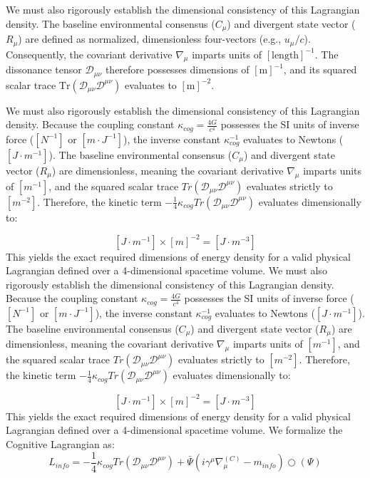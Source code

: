 \documentclass[12pt,openany]{book}
\theoremstyle{plain}
\theoremstyle{definition}
\theoremstyle{remark}
\begin{document}
We must also rigorously establish the dimensional consistency of this Lagrangian density. The baseline environmental consensus ($C_\mu$) and divergent state vector ($R_\mu$) are defined as normalized, dimensionless four-vectors (e.g., $u_\mu/c$). Consequently, the covariant derivative $\nabla_\mu$ imparts units of $[\text{length}]^{-1}$. The dissonance tensor $\mathcal{D}_{\mu\nu}$ therefore possesses dimensions of $[\text{m}]^{-1}$, and its squared scalar trace $\text{Tr}(\mathcal{D}_{\mu\nu} \mathcal{D}^{\mu\nu})$ evaluates to $[\text{m}]^{-2}$.

We must also rigorously establish the dimensional consistency of this Lagrangian density. Because the coupling constant $\kappa_{cog}=\frac{4G}{c^{4}}$ possesses the SI units of inverse force ($[N^{-1}]$ or $[m\cdot J^{-1}]$), the inverse constant $\kappa_{cog}^{-1}$ evaluates to Newtons ($[J\cdot m^{-1}]$). The baseline environmental consensus ($C_{\mu}$) and divergent state vector ($R_{\mu}$) are dimensionless, meaning the covariant derivative $\nabla_{\mu}$ imparts units of $[m^{-1}]$, and the squared scalar trace $Tr(\mathcal{D}_{\mu\nu}\mathcal{D}^{\mu\nu})$ evaluates strictly to $[m^{-2}]$. Therefore, the kinetic term $-\frac{1}{4}\kappa_{cog}Tr(\mathcal{D}_{\mu\nu}\mathcal{D}^{\mu\nu})$ evaluates dimensionally to:

$$[J\cdot m^{-1}]\times[m]^{-2}=[J\cdot m^{-3}]$$This yields the exact required dimensions of energy density for a valid physical Lagrangian defined over a 4-dimensional spacetime volume. We must also rigorously establish the dimensional consistency of this Lagrangian density. Because the coupling constant $\kappa_{cog}=\frac{4G}{c^{4}}$ possesses the SI units of inverse force ($[N^{-1}]$ or $[m\cdot J^{-1}]$), the inverse constant $\kappa_{cog}^{-1}$ evaluates to Newtons ($[J\cdot m^{-1}]$). The baseline environmental consensus ($C_{\mu}$) and divergent state vector ($R_{\mu}$) are dimensionless, meaning the covariant derivative $\nabla_{\mu}$ imparts units of $[m^{-1}]$, and the squared scalar trace $Tr(\mathcal{D}_{\mu\nu}\mathcal{D}^{\mu\nu})$ evaluates strictly to $[m^{-2}]$. Therefore, the kinetic term $-\frac{1}{4}\kappa_{cog}Tr(\mathcal{D}_{\mu\nu}\mathcal{D}^{\mu\nu})$ evaluates dimensionally to:

$$[J\cdot m^{-1}]\times[m]^{-2}=[J\cdot m^{-3}]$$This yields the exact required dimensions of energy density for a valid physical Lagrangian defined over a 4-dimensional spacetime volume. We formalize the Cognitive Lagrangian as: $$L_{info} = -\frac{1}{4}\kappa_{cog}Tr(\mathcal{D}_{\mu\nu}\mathcal{D}^{\mu\nu}) + \bar{\Psi}(i\gamma^{\mu}\nabla_{\mu}^{(C)} - m_{info}) \bigcirc(\Psi)$$
\end{document}
